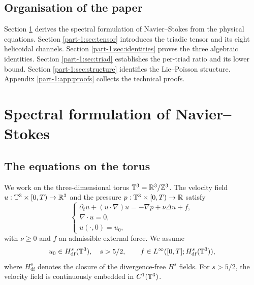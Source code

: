 \subsection{Organisation of the paper}
\label{part-1:ssec:org}

Section \ref{part-1:sec:spectral} derives the spectral formulation of 
Navier--Stokes from the physical equations. Section \ref{part-1:sec:tensor} 
introduces the triadic tensor and its eight helicoidal channels. 
Section \ref{part-1:sec:identities} proves the three algebraic identities. 
Section \ref{part-1:sec:triad} establishes the per-triad ratio and its lower 
bound. Section \ref{part-1:sec:structure} identifies the Lie--Poisson 
structure. Appendix \ref{part-1:app:proofs} collects the technical proofs.

\section{Spectral formulation of Navier--Stokes}
\label{part-1:sec:spectral}

\subsection{The equations on the torus}
\label{part-1:ssec:torus}

We work on the three-dimensional torus $\mathbb{T}^3 = \mathbb{R}^3/\mathbb{Z}^3$. The 
velocity field $u:\mathbb{T}^3\times[0,T)\to\mathbb{R}^3$ and the pressure 
$p:\mathbb{T}^3\times[0,T)\to\mathbb{R}$ satisfy
\begin{equation}\label{part-1:eq:NS-torus}
\begin{cases}
\partial_t u + (u\cdot\nabla)u = -\nabla p + \nu\Delta u + f, \\[2pt]
\nabla\cdot u = 0, \\[2pt]
u(\cdot,0) = u_0,
\end{cases}
\end{equation}
with $\nu \geq 0$ and $f$ an admissible external force. We assume
\begin{equation}\label{part-1:eq:function-spaces}
u_0 \in H^s_{\mathrm{df}}(\mathbb{T}^3), \quad s > 5/2,
\qquad
f \in L^\infty([0,T];H^s_{\mathrm{df}}(\mathbb{T}^3)),
\end{equation}
where $H^s_{\mathrm{df}}$ denotes the closure of the divergence-free 
$H^s$ fields. For $s>5/2$, the velocity field is continuously embedded 
in $C^1(\mathbb{T}^3)$.

